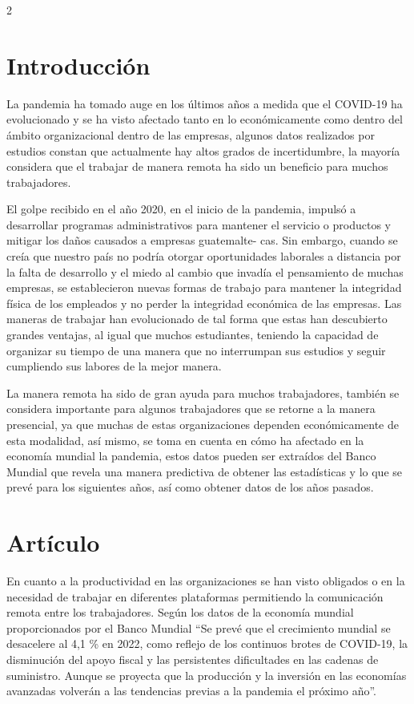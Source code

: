 \documentclass[12pt,spanish,Letterpaper,openany]{book}
\begin{document}
\begin {multicols}{2}

\hypertarget{introducciuxf3n-6}{%
\section{Introducción}\label{introducciuxf3n-6}}

La pandemia ha tomado auge en los últimos años a medida que el COVID-19 ha evolucionado y se ha visto afectado tanto en lo económicamente como dentro del ámbito organizacional dentro de las empresas, algunos datos realizados por estudios constan que actualmente hay altos grados de incertidumbre, la mayoría considera que el trabajar de manera remota ha sido un beneficio para muchos trabajadores.

El golpe recibido en el año 2020, en el inicio de la pandemia, impulsó a desarrollar programas administrativos para mantener el servicio o productos y mitigar los daños causados a empresas guatemalte-
cas. Sin embargo, cuando se creía que nuestro país no podría otorgar oportunidades laborales a distancia por la falta de desarrollo y el miedo al cambio que invadía el pensamiento de muchas empresas, se establecieron nuevas formas de trabajo para mantener la integridad física de los empleados y no perder la integridad económica de las empresas. Las maneras de trabajar han evolucionado de tal forma que estas han descubierto grandes ventajas, al igual que muchos estudiantes, teniendo la capacidad de organizar su tiempo de una manera que no interrumpan sus estudios y seguir cumpliendo sus labores de la mejor manera.

La manera remota ha sido de gran ayuda para muchos trabajadores, también se considera importante para algunos trabajadores que se retorne a la manera presencial, ya que muchas de estas organizaciones dependen económicamente de esta modalidad, así mismo, se toma en cuenta en cómo ha afectado en la economía mundial la pandemia, estos datos pueden ser extraídos del Banco Mundial que revela una manera predictiva de obtener las estadísticas y lo que se prevé para los siguientes años, así como obtener datos de los años pasados.

\hypertarget{artuxedculo-2}{%
\section{Artículo}\label{artuxedculo-2}}

En cuanto a la productividad en las organizaciones se han visto obligados o en la necesidad de trabajar en diferentes plataformas permitiendo la comunicación remota entre los trabajadores. Según los datos de la economía mundial proporcionados por el Banco Mundial ``Se prevé que el crecimiento mundial se desacelere al 4,1 \% en 2022, como reflejo de los continuos brotes de COVID-19, la disminución del apoyo fiscal y las persistentes dificultades en las cadenas de suministro. Aunque se proyecta que la producción y la inversión en las economías avanzadas volverán a las tendencias previas a la pandemia el próximo año''.


\end{multicols}
\end{document}

